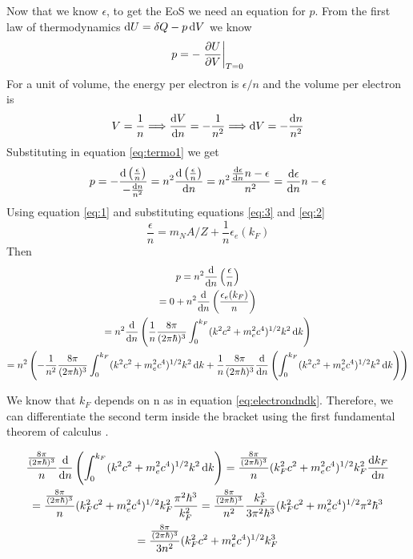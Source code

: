 \documentclass[a4paper]{article}
\begin{document}
Now that we know $\epsilon$, to get the EoS we need an equation for $p$. From the first law of thermodynamics $\odif{U} = \fdif{Q} - p\odif{V}$ we know
\begin{equation} \label{eq:termo1}
    p=-\pdv[delims-eval=.|]{U}{V}_{T = 0}
\end{equation}
For a unit of volume, the energy per electron is $\epsilon/n$ and the volume per electron is
\begin{equation}
    V = \frac{1}{n} \Longrightarrow \odv{V}{n} = -\frac{1}{n^2} \Longrightarrow \odif{V} = -\frac{\odif{n}}{n^2}
\end{equation}
Substituting in equation \eqref{eq:termo1} we get
\begin{equation}
    p = - \frac{\odif{\left(\frac{\epsilon}{n}\right)}}{-\frac{\odif{n}}{n^2}} = n^2\frac{\odif{\left(\frac{\epsilon}{n}\right)}}{\odif{n}} = n^2\frac{\odv{\epsilon}{n}n-\epsilon}{n^2} = \odv{\epsilon}{n}n-\epsilon
\end{equation}
Using equation \eqref{eq:1} and substituting equations \eqref{eq:3} and \eqref{eq:2}
\begin{equation} \label{eq:15}
    \frac{\epsilon}{n} = m_N A/Z + \frac{1}{n}\epsilon_e(k_F)
\end{equation}
Then
\begin{gather*}
     p = n^2 \odv*{\left(\frac{\epsilon}{n}\right)}{n}\\
     = 0 + n^2\odv*{\left(\frac{\epsilon_e(k_F)}{n}\right)}{n}\\
    = n^2\odv*{\left(\frac{1}{n} \frac{8\pi}{(2\pi\hbar)^3} \int^{k_F}_{0} (k^2c^2+m_e^2c^4)^{1/2} k^2 \odif{k}\right)}{n}\\
    = n^2\left(-\frac{1}{n^2} \frac{8\pi}{(2\pi\hbar)^3}  \int^{k_F}_{0} (k^2c^2+m_e^2c^4)^{1/2} k^2  \odif{k} + \frac{1}{n} \frac{8\pi}{(2\pi\hbar)^3} \odv*{\left(\int^{k_F}_{0}(k^2c^2+m_e^2c^4)^{1/2} k^2 \odif{k} \right)}{n}\right) \\
\end{gather*}

We know that $k_F$ depends on n as in equation \eqref{eq:electrondndk}. Therefore, we can differentiate the second term inside the bracket using the first fundamental theorem of calculus \cite{spivak}.

\begin{gather*}
    \frac{\frac{8\pi}{(2\pi\hbar)^3} }{n} \odv*{\left(\int^{k_F}_{0}(k^2c^2+m_e^2c^4)^{1/2} k^2 \odif{k} \right)}{n}  = \frac{\frac{8\pi}{(2\pi\hbar)^3} }{n}(k_F^2c^2+m_e^2c^4)^{1/2} k_F^2 \odv{k_F}{n}\\
    = \frac{\frac{8\pi}{(2\pi\hbar)^3} }{n}(k_F^2c^2+m_e^2c^4)^{1/2} k_F^2 \frac{\pi^2\hbar^3}{k_F^2}
    = \frac{\frac{8\pi}{(2\pi\hbar)^3} }{n^2} \frac{k_F^3}{3\pi^2\hbar^3}
    (k_F^2c^2+m_e^2c^4)^{1/2} \pi^2\hbar^3\\
    = \frac{\frac{8\pi}{(2\pi\hbar)^3} }{3 n^2}
    (k_F^2c^2+m_e^2c^4)^{1/2} k_F^3 \\
\end{gather*}
\end{document}
